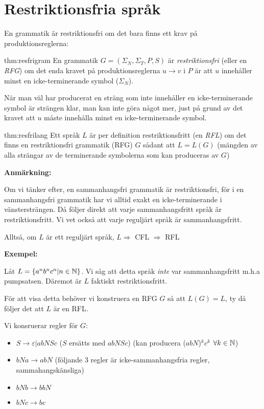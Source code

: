 \section{Restriktionsfria språk}\par
\noindent En grammatik är restriktionsfri om det bara finns ett krav på produktionsreglerna:
\par\bigskip
\begin{theo}{thm:resfrigram}
  En grammatik $G = (\Sigma_N,\Sigma_T, P, S)$ är \textit{restriktionsfri} (eller en \textit{RFG}) om det enda kravet på produktionsreglerna $u\to v$ i $P$ är att $u$ innehåller minst en icke-terminerande symbol ($\Sigma_N$).
\end{theo}
\par\bigskip
\noindent När man väl har producerat en sträng som inte innehåller en icke-terminerande symbol är strängen klar, man kan inte göra något mer, just på grund av det kravet att $u$ måste innehålla minst en icke-terminerande symbol.
\par\bigskip
\begin{theo}{thm:resfrilang}
  Ett språk $L$ är per definition restriktionsfritt (en \textit{RFL}) om det finns en restriktionsfri grammatik (RFG) $G$ sådant att $L = L(G)$ (mängden av alla strängar av de terminerande symbolerna som kan produceras av $G$)
\end{theo}
\par\bigskip
\noindent\textbf{Anmärkning:}\par
\noindent Om vi tänker efter, en sammanhangsfri grammatik är restriktionsfri, för i en sammanhangsfri grammatik har vi alltid exakt en icke-terminerande i vänstersträngen. Då följer direkt att varje sammanhangsfritt språk är restriktionsfritt. Vi vet också att varje reguljärt språk är sammanhangsfritt.
\par\bigskip
\noindent Alltså, om $L$ är ett reguljärt språk, $L\Rightarrow$ CFL $\Rightarrow$ RFL
\par\bigskip
\noindent\textbf{Exempel:}\par
\noindent Låt $L = \left\{a^nb^nc^n|n\in\mathbb{N}\right\}$. Vi såg att detta språk \textit{inte} var sammanhangsfritt m.h.a pumpsatsen. Däremot är $L$ faktiskt restriktionsfritt.\par
\noindent För att visa detta behöver vi konstruera en RFG $G$ så att $L(G) = L$, ty då följer det att $L$ är en RFL.
\par\bigskip
\noindent Vi konsruerar regler för $G$:
\begin{itemize}
  \item $S\to\varepsilon|abNSc$ ($S$ ersätts med $abNSc$) (kan producera ($abN$)$^kc^k$ $\forall k\in\mathbb{N}$)
  \item $bNa\to abN$ (följande 3 regler är icke-sammanhangsfria regler, sammahangskänsliga)
  \item $bNb\to bbN$
  \item $bNc\to bc$
\end{itemize}
